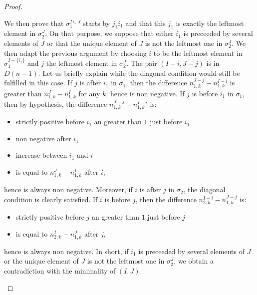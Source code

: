 \documentclass{amsart}
\theoremstyle{definition}
\begin{document}
\begin{proof}
\begin{itemize}
We then prove that $\sigma^{I \cup J}_1$ starts by $j_1 i_1$ and that this $j_1$ is exactly the leftmost element in  $\sigma^{J}_2$. On that purpose, we suppose that either  $i_1$ is preceeded by several elements of $J$ or that the unique element of $J$ is not the leftmost one in $\sigma^{J}_2$. We then adapt the previous argument by choosing $i$ to be the leftmost element in $\sigma^{I-\{i_1\}}_1$ and $j$ the leftmost element in $\sigma^{J}_2$. The pair $(I-i,J-j)$ is in $D(n-1)$. Let us briefly explain while  the diagonal condition would still be fulfilled in this case. If $j$ is after $i_1$ in $\sigma_1$, then the difference $n_{1,k}^{J-j}-n_{1,k}^{I-i}$ is greater than $n_{1,k}^{J}-n_{1,k}^{I}$ for any $k$, hence is non negative. If $j$ is before $i_1$ in $\sigma_1$, then by hypothesis, the difference $n_{1,k}^{J-j}-n_{1,k}^{I-i}$ is:
\begin{itemize}
\item strictly positive before $i_1$ an greater than $1$ just before $i_1$
\item non negative after $i_1$
\item increase between $i_1$ and $i$
\item is equal to $n_{1,k}^{J}-n_{1,k}^{I}$ after $i$,
\end{itemize} 
hence is always non negative.
Moreover, if $i$ is after $j$ in $\sigma_2$, the diagonal condition is clearly satisfied. If $i$ is before $j$, then the difference $n_{2,k}^{I-i}-n_{1,k}^{J-j}$ is:
\begin{itemize}
\item strictly positive before $j$ an greater than $1$ just before $j$
\item is equal to $n_{2,k}^{I}-n_{1,k}^{J}$ after $j$,
\end{itemize} 
hence is always non negative. In short, if $i_1$ is preceeded by several elements of $J$ or the unique element of $J$ is not the leftmost one in $\sigma^{J}_2$, we obtain a contradiction with the minimality of $(I,J)$.


\end{itemize}
\end{proof}
\end{document}
